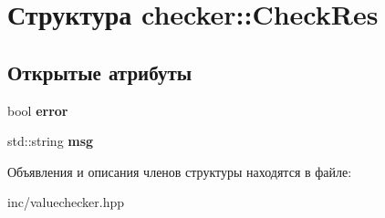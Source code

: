 \hypertarget{structchecker_1_1CheckRes}{}\section{Структура checker\+:\+:Check\+Res}
\label{structchecker_1_1CheckRes}
\subsection*{Открытые атрибуты}
\begin{DoxyCompactItemize}
\item 
\mbox{\label{structchecker_1_1CheckRes_a2e3be2b1210805a2da5ed1bd562d7662}} 
bool {\bfseries error}
\item 
\mbox{\label{structchecker_1_1CheckRes_a8515bcbdcddecb15619527a055f36963}} 
std\+::string {\bfseries msg}
\end{DoxyCompactItemize}


Объявления и описания членов структуры находятся в файле\+:\begin{DoxyCompactItemize}
\item 
inc/valuechecker.\+hpp\end{DoxyCompactItemize}
